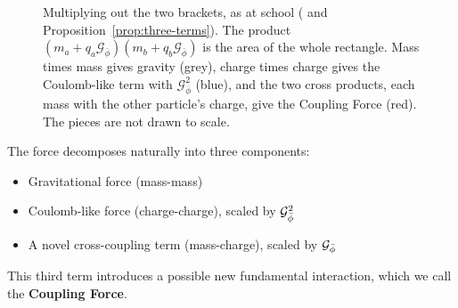\begin{figure}[tb]
\myfloatalign
{}
\caption[Multiplying out the two brackets]{Multiplying out the two brackets, as at school ( and Proposition~\ref{prop:three-terms}). The product $(m_a + q_a\mathcal{G}_{\bar{\phi}})(m_b + q_b\mathcal{G}_{\bar{\phi}})$ is the area of the whole rectangle. Mass times mass gives gravity (grey), charge times charge gives the Coulomb-like term with $\mathcal{G}_{\bar{\phi}}^2$ (blue), and the two cross products, each mass with the other particle's charge, give the Coupling Force (red). The pieces are not drawn to scale.}
\label{fig:product-area}
\end{figure}

\begin{remark}\label{rem:three-components}
The force decomposes naturally into three components:
\begin{itemize}
  \item Gravitational force (mass-mass)
  \item Coulomb-like force (charge-charge), scaled by $\mathcal{G}_{\bar{\phi}}^2$
  \item A novel cross-coupling term (mass-charge), scaled by $\mathcal{G}_{\bar{\phi}}$
\end{itemize}
This third term introduces a possible new fundamental interaction, which we call the \textbf{Coupling Force}.
\end{remark}

